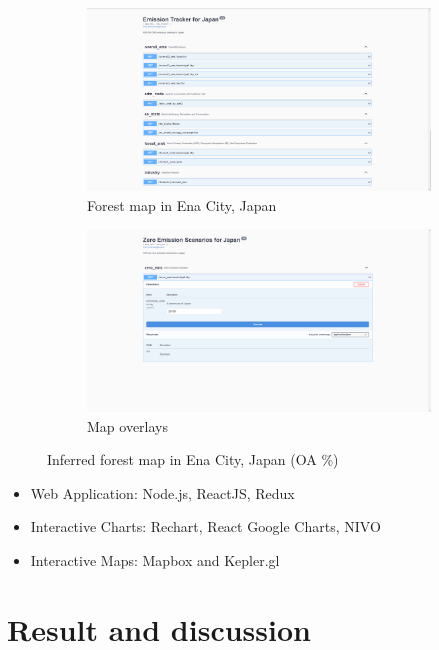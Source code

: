 \begin{figure}[tbh!]
  \centering
  \begin{subfigure}{.5\textwidth}
      \centering
      \includegraphics[width=.9\textwidth]{figs/chap7/api1.png}
      \caption{Forest map in Ena City, Japan}
  \end{subfigure}%
  \begin{subfigure}{.5\textwidth}
      \centering
      \includegraphics[width=.9\textwidth]{figs/chap7/api2.png}
      \caption{Map overlays}
  \end{subfigure}
  \caption[Inferred forest map in Ena City]{Inferred forest map in Ena City, Japan  (OA \%)}
  \label{fig:chap7_fig3}
\end{figure}


\begin{itemize}
    \item Web Application: Node.js, ReactJS, Redux
    \item Interactive Charts: Rechart, React Google Charts, NIVO
    \item Interactive Maps: Mapbox and Kepler.gl
\end{itemize}
\section{Result and discussion}
